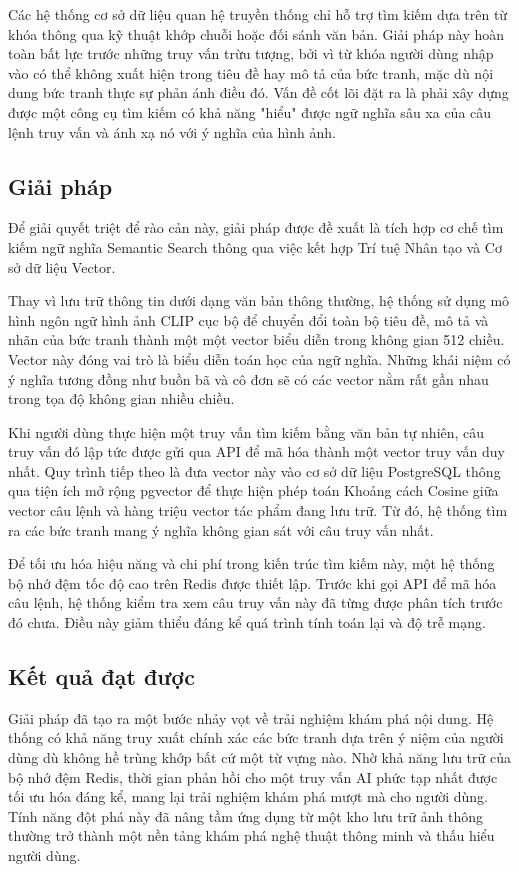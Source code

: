 Các hệ thống cơ sở dữ liệu quan hệ truyền thống chỉ hỗ trợ tìm kiếm dựa trên từ khóa thông qua kỹ thuật khớp chuỗi hoặc đối sánh văn bản. Giải pháp này hoàn toàn bất lực trước những truy vấn trừu tượng, bởi vì từ khóa người dùng nhập vào có thể không xuất hiện trong tiêu đề hay mô tả của bức tranh, mặc dù nội dung bức tranh thực sự phản ánh điều đó. Vấn đề cốt lõi đặt ra là phải xây dựng được một công cụ tìm kiếm có khả năng "hiểu" được ngữ nghĩa sâu xa của câu lệnh truy vấn và ánh xạ nó với ý nghĩa của hình ảnh.

\subsection{Giải pháp}
Để giải quyết triệt để rào cản này, giải pháp được đề xuất là tích hợp cơ chế tìm kiếm ngữ nghĩa Semantic Search thông qua việc kết hợp Trí tuệ Nhân tạo và Cơ sở dữ liệu Vector.

Thay vì lưu trữ thông tin dưới dạng văn bản thông thường, hệ thống sử dụng mô hình ngôn ngữ hình ảnh CLIP cục bộ để chuyển đổi toàn bộ tiêu đề, mô tả và nhãn của bức tranh thành một một vector biểu diễn trong không gian 512 chiều. Vector này đóng vai trò là biểu diễn toán học của ngữ nghĩa. Những khái niệm có ý nghĩa tương đồng như buồn bã và cô đơn sẽ có các vector nằm rất gần nhau trong tọa độ không gian nhiều chiều.

Khi người dùng thực hiện một truy vấn tìm kiếm bằng văn bản tự nhiên, câu truy vấn đó lập tức được gửi qua API để mã hóa thành một vector truy vấn duy nhất. Quy trình tiếp theo là đưa vector này vào cơ sở dữ liệu PostgreSQL thông qua tiện ích mở rộng pgvector để thực hiện phép toán Khoảng cách Cosine giữa vector câu lệnh và hàng triệu vector tác phẩm đang lưu trữ. Từ đó, hệ thống tìm ra các bức tranh mang ý nghĩa không gian sát với câu truy vấn nhất.

Để tối ưu hóa hiệu năng và chi phí trong kiến trúc tìm kiếm này, một hệ thống bộ nhớ đệm tốc độ cao trên Redis được thiết lập. Trước khi gọi API để mã hóa câu lệnh, hệ thống kiểm tra xem câu truy vấn này đã từng được phân tích trước đó chưa. Điều này giảm thiểu đáng kể quá trình tính toán lại và độ trễ mạng.

\subsection{Kết quả đạt được}
Giải pháp đã tạo ra một bước nhảy vọt về trải nghiệm khám phá nội dung. Hệ thống có khả năng truy xuất chính xác các bức tranh dựa trên ý niệm của người dùng dù không hề trùng khớp bất cứ một từ vựng nào. Nhờ khả năng lưu trữ của bộ nhớ đệm Redis, thời gian phản hồi cho một truy vấn AI phức tạp nhất được tối ưu hóa đáng kể, mang lại trải nghiệm khám phá mượt mà cho người dùng. Tính năng đột phá này đã nâng tầm ứng dụng từ một kho lưu trữ ảnh thông thường trở thành một nền tảng khám phá nghệ thuật thông minh và thấu hiểu người dùng.



